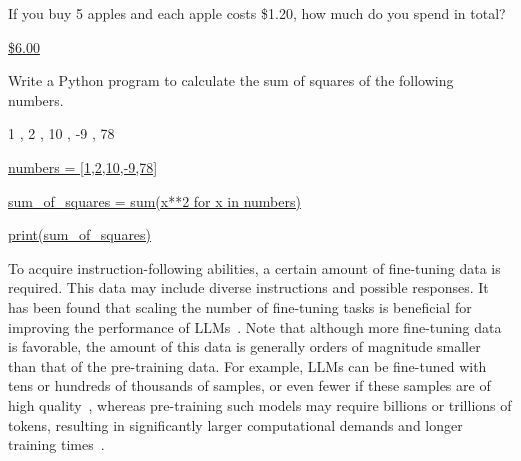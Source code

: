 \vspace{0.5em}
\begin{tcolorbox}
\begin{center}
\parbox{0.9\textwidth}
{
{\color{blue} If you buy 5 apples and each apple costs \$1.20, how much do you spend in total? }

\vspace{0.3em}

\underline{\$6.00}
}
\end{center}
\end{tcolorbox}

\vspace{0.5em}
\begin{tcolorbox}
\begin{center}
\parbox{0.9\textwidth}
{
{\color{blue} Write a Python program to calculate the sum of squares of the following numbers.}

{\color{blue} 1 , 2 , 10 , -9 , 78}

\vspace{0.3em}

\underline{numbers = [1,2,10,-9,78]}

\underline{sum\_of\_squares = sum(x**2 for x in numbers)}

\underline{print(sum\_of\_squares)}
}
\end{center}
\end{tcolorbox}
\vspace{0.5em}

To acquire instruction-following abilities, a certain amount of fine-tuning data is required. This data may include diverse instructions and possible responses. It has been found that scaling the number of fine-tuning tasks is beneficial for improving the performance of LLMs~\cite{chung-etal:2022scaling}. Note that although more fine-tuning data is favorable, the amount of this data is generally orders of magnitude smaller than that of the pre-training data. For example, LLMs can be fine-tuned with tens or hundreds of thousands of samples, or even fewer if these samples are of high quality~\cite{zhou-etal:2023lima,chen-etal:2023alpagasus}, whereas pre-training such models may require billions or trillions of tokens, resulting in significantly larger computational demands and longer training times~\cite{touvron-etal:2023llama}.

